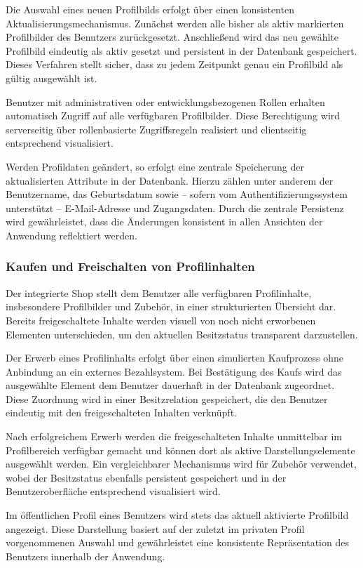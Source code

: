 Die Auswahl eines neuen Profilbilds erfolgt über einen konsistenten Aktualisierungsmechanismus. 
Zunächst werden alle bisher als aktiv markierten Profilbilder des Benutzers zurückgesetzt. 
Anschließend wird das neu gewählte Profilbild eindeutig als aktiv gesetzt und persistent in der Datenbank gespeichert. 
Dieses Verfahren stellt sicher, dass zu jedem Zeitpunkt genau ein Profilbild als gültig ausgewählt ist.

Benutzer mit administrativen oder entwicklungsbezogenen Rollen erhalten automatisch Zugriff auf alle verfügbaren Profilbilder. 
Diese Berechtigung wird serverseitig über rollenbasierte Zugriffsregeln realisiert und clientseitig entsprechend visualisiert.

Werden Profildaten geändert, so erfolgt eine zentrale Speicherung der aktualisierten Attribute in der Datenbank. 
Hierzu zählen unter anderem der Benutzername, das Geburtsdatum sowie – sofern vom Authentifizierungssystem unterstützt – E-Mail-Adresse und Zugangsdaten. 
Durch die zentrale Persistenz wird gewährleistet, dass die Änderungen konsistent in allen Ansichten der Anwendung reflektiert werden.

\subsubsection{Kaufen und Freischalten von Profilinhalten}
Der integrierte Shop stellt dem Benutzer alle verfügbaren Profilinhalte, insbesondere Profilbilder und Zubehör, in einer strukturierten Übersicht dar. 
Bereits freigeschaltete Inhalte werden visuell von noch nicht erworbenen Elementen unterschieden, um den aktuellen Besitzstatus transparent darzustellen.

Der Erwerb eines Profilinhalts erfolgt über einen simulierten Kaufprozess ohne Anbindung an ein externes Bezahlsystem. 
Bei Bestätigung des Kaufs wird das ausgewählte Element dem Benutzer dauerhaft in der Datenbank zugeordnet. 
Diese Zuordnung wird in einer Besitzrelation gespeichert, die den Benutzer eindeutig mit den freigeschalteten Inhalten verknüpft.

Nach erfolgreichem Erwerb werden die freigeschalteten Inhalte unmittelbar im Profilbereich verfügbar gemacht und können dort als aktive Darstellungselemente ausgewählt werden. 
Ein vergleichbarer Mechanismus wird für Zubehör verwendet, wobei der Besitzstatus ebenfalls persistent gespeichert und in der Benutzeroberfläche entsprechend visualisiert wird.

Im öffentlichen Profil eines Benutzers wird stets das aktuell aktivierte Profilbild angezeigt. 
Diese Darstellung basiert auf der zuletzt im privaten Profil vorgenommenen Auswahl und gewährleistet eine konsistente Repräsentation des Benutzers innerhalb der Anwendung.


